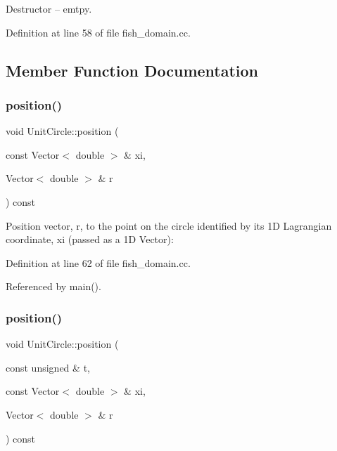 Destructor -- emtpy. 



Definition at line 58 of file fish\+\_\+domain.\+cc.



\subsection{Member Function Documentation}
\mbox{\label{classUnitCircle_adc7fc660ba1d2ecc5bcbe2312e2fb87b}} 
\subsubsection{\texorpdfstring{position()}{position()}\hspace{0.1cm}{\footnotesize\ttfamily [1/2]}}
{\footnotesize\ttfamily void Unit\+Circle\+::position (\begin{DoxyParamCaption}\item[{const Vector$<$ double $>$ \&}]{xi,  }\item[{Vector$<$ double $>$ \&}]{r }\end{DoxyParamCaption}) const\hspace{0.3cm}{\ttfamily [inline]}}



Position vector, r, to the point on the circle identified by its 1D Lagrangian coordinate, xi (passed as a 1D Vector)\+: 



Definition at line 62 of file fish\+\_\+domain.\+cc.



Referenced by main().

\mbox{\label{classUnitCircle_aef5327f81f396de4ecbf8c0aa7de08d3}} 
\subsubsection{\texorpdfstring{position()}{position()}\hspace{0.1cm}{\footnotesize\ttfamily [2/2]}}
{\footnotesize\ttfamily void Unit\+Circle\+::position (\begin{DoxyParamCaption}\item[{const unsigned \&}]{t,  }\item[{const Vector$<$ double $>$ \&}]{xi,  }\item[{Vector$<$ double $>$ \&}]{r }\end{DoxyParamCaption}) const\hspace{0.3cm}{\ttfamily [inline]}}



